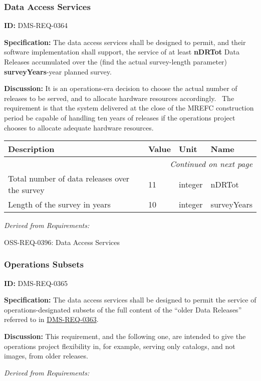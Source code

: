 \documentclass[SE,toc,lsstdraft]{lsstdoc}
\makeatletter
\newcommand{\paramname}[1]{\hspace{0pt}#1}
\newcommand{\unitname}[1]{\hspace{0pt}#1}
\newenvironment{parameters}[0]{%
\setlength\LTleft{0pt}
\setlength\LTright{\fill}
\begin{small}
\begin{longtable}[]{|p{0.49\textwidth}|l|p{0.6in}|p{1.70in}@{}|}

\hline \textbf{Description} & \textbf{Value} & \textbf{Unit} & \textbf{Name} \\ \hline
\endhead

\hline \multicolumn{4}{r}{\emph{Continued on next page}} \\
\endfoot

\hline\hline
\endlastfoot
}{%
\hline
\end{longtable}
\end{small}
}
\makeatother
\begin{document}
\subsubsection{Data Access Services}

\label{DMS-REQ-0364}
\textbf{ID:} DMS-REQ-0364

\textbf{Specification:}
The data access services shall be designed to permit, and their software implementation shall support, the service of at least \textbf{nDRTot} Data Releases accumulated over the (find the actual survey-length parameter) \textbf{surveyYears}-year planned survey.

\textbf{Discussion:}
It is an operations-era decision to choose the actual number of releases to be served, and to allocate hardware resources accordingly.  The requirement is that the system delivered at the close of the MREFC construction period be capable of handling ten years of releases if the operations project chooses to allocate adequate hardware resources.

\begin{parameters}
Total number of data releases over the survey
&
11
&
\unitname{%
integer
}
&
\paramname{%
nDRTot
} \\\hline
Length of the survey in years
&
10
&
\unitname{%
integer
}
&
\paramname{%
surveyYears
} \\\hline
\end{parameters}

\emph{Derived from Requirements:}

OSS-REQ-0396:
Data Access Services \newline

\subsubsection{Operations Subsets}

\label{DMS-REQ-0365}
\textbf{ID:} DMS-REQ-0365

\textbf{Specification:}
The data access services shall be designed to permit the service of operations-designated subsets of the full content of the “older Data Releases” referred to in \hyperref[DMS-REQ-0363]{DMS-REQ-0363}.

\textbf{Discussion:}
This requirement, and the following one, are intended to give the operations project flexibility in, for example, serving only catalogs, and not images, from older releases.

\emph{Derived from Requirements:}
\end{document}
